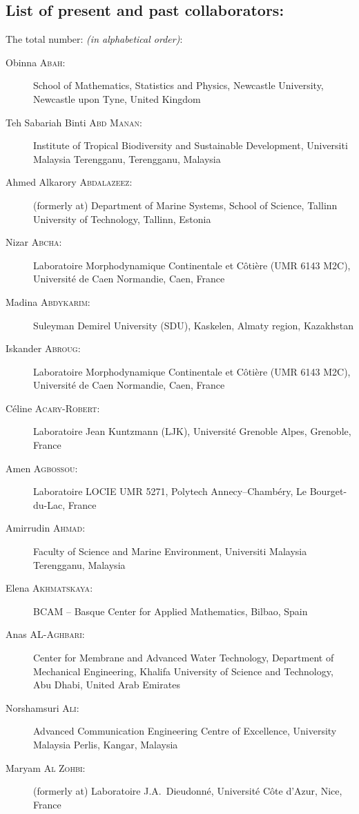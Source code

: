 \subsection{List of present and past collaborators:}

The total number: \textbf{\nextitemizecount{}} \emph{(in alphabetical order)}:

\begin{description}
  \item[Obinna \textsc{Abah}:] School of Mathematics, Statistics and Physics, Newcastle University, Newcastle upon Tyne, United Kingdom
  \item[Teh Sabariah Binti \textsc{Abd Manan}:] Institute of Tropical Biodiversity and Sustainable Development, Universiti Malaysia Terengganu, Terengganu, Malaysia
  \item[Ahmed Alkarory \textsc{Abdalazeez}:] (formerly at) Department of Marine Systems, School of Science, Tallinn University of Technology, Tallinn, Estonia
  \item[Nizar \textsc{Abcha}:] Laboratoire Morphodynamique Continentale et C\^oti\`ere (UMR 6143 M2C), Universit\'e de Caen Normandie, Caen, France
  \item[Madina \textsc{Abdykarim}:] Suleyman Demirel University (SDU), Kaskelen, Almaty region, Kazakhstan
  \item[Iskander \textsc{Abroug}:] Laboratoire Morphodynamique Continentale et C\^oti\`ere (UMR 6143 M2C), Universit\'e de Caen Normandie, Caen, France
  \item[C\'eline \textsc{Acary-Robert}:] Laboratoire Jean Kuntzmann (LJK), Universit\'e Grenoble Alpes, Grenoble, France
  \item[Amen \textsc{Agbossou}:] Laboratoire LOCIE UMR 5271, Polytech Annecy--Chamb\'ery, Le Bourget-du-Lac, France
  \item[Amirrudin \textsc{Ahmad}:] Faculty of Science and Marine Environment, Universiti Malaysia Terengganu, Malaysia
  \item[Elena \textsc{Akhmatskaya}:] BCAM -- Basque Center for Applied Mathematics, Bilbao, Spain
  \item[Anas \textsc{AL-Aghbari}:] Center for Membrane and Advanced Water Technology, Department of Mechanical Engineering, Khalifa University of Science and Technology, Abu Dhabi, United Arab Emirates
  \item[Norshamsuri \textsc{Ali}:] Advanced Communication Engineering Centre of Excellence, University Malaysia Perlis, Kangar, Malaysia
  \item[Maryam \textsc{Al Zohbi}:] (formerly at) Laboratoire J.A.~Dieudonn\'e, Universit\'e C\^ote d'Azur, Nice, France

\end{description}
